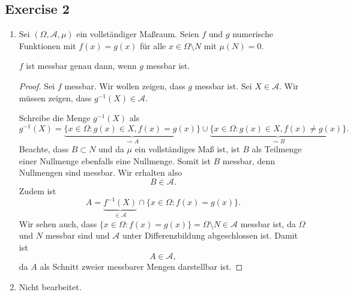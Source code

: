 \documentclass[a4paper]{article}
\begin{document}
\subsection*{Exercise 2}
\begin{enumerate}[label=(\roman*)]
\item Sei $(\Omega, \mathcal A, \mu)$ ein vollständiger Maßraum. Seien $f$ und $g$ numerische Funktionen mit $f(x) =g(x)$ für alle $x \in \Omega \setminus N$ mit $\mu(N) = 0$.
\begin{issue}{}{}
$f$ ist messbar genau dann, wenn $g$ messbar ist.
\end{issue}
\begin{proof}
Sei $f$ messbar. Wir wollen zeigen, dass $g$ messbar ist. Sei $X \in \mathcal A$. Wir müssen zeigen, dass $g^{-1}(X) \in \mathcal A$.

Schreibe die Menge $g^{-1}(X)$ als
\[
	g^{-1}(X) = \underbrace{\{ x \in \Omega : g(x) \in X, f(x) = g(x) \}}_{\coloneqq A} \cup \underbrace{\{ x \in \Omega : g(x) \in X, f(x) \neq g(x) \}}_{\coloneqq B}.
\]
Beachte, dass $B \subset N$ und da $\mu$ ein vollständiges Maß ist, ist $B$ als Teilmenge einer Nullmenge ebenfalls eine Nullmenge. Somit ist $B$ messbar, denn Nullmengen sind messbar. Wir erhalten also
\[
	B \in \mathcal A.
\]
Zudem ist $$A = \underbrace{f^{-1}(X)}_{\in \mathcal A} \cap \{ x \in \Omega : f(x) = g(x) \}.$$
Wir sehen auch, dass $\{ x \in \Omega : f(x) = g(x) \} = \Omega \setminus N  \in \mathcal A$ messbar ist, da $\Omega$ und $N$ messbar sind und $\mathcal A$ unter Differenzbildung abgeschlossen ist. Damit ist $$A \in \mathcal A,$$ da $A$ als Schnitt zweier messbarer Mengen darstellbar ist.
\end{proof}

\item Nicht bearbeitet.
\end{enumerate}
\end{document}
